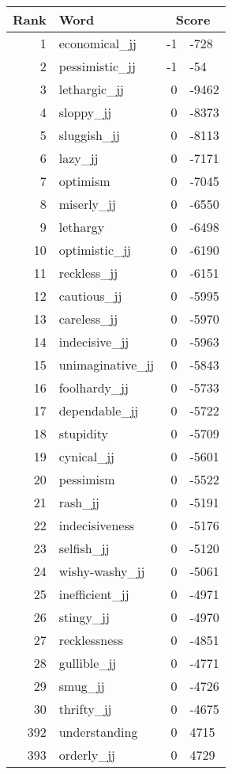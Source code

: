 \begin{longtable}[!htbp]{| rlr@{.}l |}
    \hline
    \textbf{Rank} & \textbf{Word} & \multicolumn{2}{c|}{\textbf{Score}} \\
    \hline
    \endhead
    1 & economical\_jj & -1 & -728 \\
    2 & pessimistic\_jj & -1 & -54 \\
    3 & lethargic\_jj & 0 & -9462 \\
    4 & sloppy\_jj & 0 & -8373 \\
    5 & sluggish\_jj & 0 & -8113 \\
    6 & lazy\_jj & 0 & -7171 \\
    7 & optimism & 0 & -7045 \\
    8 & miserly\_jj & 0 & -6550 \\
    9 & lethargy & 0 & -6498 \\
    10 & optimistic\_jj & 0 & -6190 \\
    11 & reckless\_jj & 0 & -6151 \\
    12 & cautious\_jj & 0 & -5995 \\
    13 & careless\_jj & 0 & -5970 \\
    14 & indecisive\_jj & 0 & -5963 \\
    15 & unimaginative\_jj & 0 & -5843 \\
    16 & foolhardy\_jj & 0 & -5733 \\
    17 & dependable\_jj & 0 & -5722 \\
    18 & stupidity & 0 & -5709 \\
    19 & cynical\_jj & 0 & -5601 \\
    20 & pessimism & 0 & -5522 \\
    21 & rash\_jj & 0 & -5191 \\
    22 & indecisiveness & 0 & -5176 \\
    23 & selfish\_jj & 0 & -5120 \\
    24 & wishy-washy\_jj & 0 & -5061 \\
    25 & inefficient\_jj & 0 & -4971 \\
    26 & stingy\_jj & 0 & -4970 \\
    27 & recklessness & 0 & -4851 \\
    28 & gullible\_jj & 0 & -4771 \\
    29 & smug\_jj & 0 & -4726 \\
    30 & thrifty\_jj & 0 & -4675 \\
    392 & understanding & 0 & 4715 \\
    393 & orderly\_jj & 0 & 4729 \\

\end{longtable}
